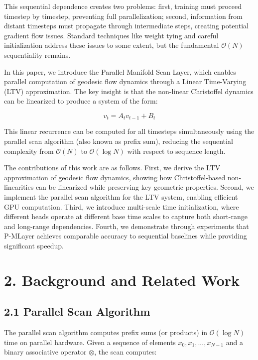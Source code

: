 \documentclass[12pt]{article}
\begin{document}
This sequential dependence creates two problems: first, training must proceed timestep by timestep, preventing full parallelization; second, information from distant timesteps must propagate through intermediate steps, creating potential gradient flow issues. Standard techniques like weight tying and careful initialization address these issues to some extent, but the fundamental $\mathcal{O}(N)$ sequentiality remains.

In this paper, we introduce the Parallel Manifold Scan Layer, which enables parallel computation of geodesic flow dynamics through a Linear Time-Varying (LTV) approximation. The key insight is that the non-linear Christoffel dynamics can be linearized to produce a system of the form:

\begin{equation}
v_t = A_t v_{t-1} + B_t
\end{equation}

This linear recurrence can be computed for all timesteps simultaneously using the parallel scan algorithm (also known as prefix sum), reducing the sequential complexity from $\mathcal{O}(N)$ to $\mathcal{O}(\log N)$ with respect to sequence length.

The contributions of this work are as follows. First, we derive the LTV approximation of geodesic flow dynamics, showing how Christoffel-based non-linearities can be linearized while preserving key geometric properties. Second, we implement the parallel scan algorithm for the LTV system, enabling efficient GPU computation. Third, we introduce multi-scale time initialization, where different heads operate at different base time scales to capture both short-range and long-range dependencies. Fourth, we demonstrate through experiments that P-MLayer achieves comparable accuracy to sequential baselines while providing significant speedup.

\section{2. Background and Related Work}

\subsection{2.1 Parallel Scan Algorithm}

The parallel scan algorithm computes prefix sums (or products) in $\mathcal{O}(\log N)$ time on parallel hardware. Given a sequence of elements $x_0, x_1, ..., x_{N-1}$ and a binary associative operator $\otimes$, the scan computes:
\end{document}
